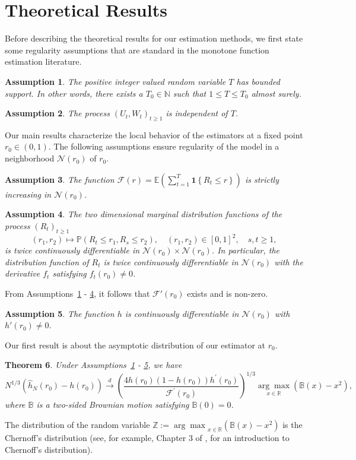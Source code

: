 \documentclass[12pt]{amsart}
\theoremstyle{plain}
\newtheorem{theorem}{Theorem}[section]
\newtheorem{assumption}[theorem]{Assumption}
\theoremstyle{remark}
\numberwithin{equation}{section}
\begin{document}
\section{Theoretical Results}\label{sec3}
Before describing the theoretical results for our estimation methods, we first state some regularity assumptions that are standard in the monotone function estimation literature. 
\begin{assumption}\label{a1}
   The positive integer valued random variable $T$ has bounded support. In other words, there exists a $T_0 \in \mathbb{N}$ such that $1 \leq T \leq T_0$ almost surely.
\end{assumption}
\begin{assumption}\label{a12}
   The process $(U_t, W_t)_{t\geq 1}$ is independent of $T$.
\end{assumption}

Our main results characterize the local behavior of the estimators at a fixed point $r_0 \in (0,1)$. The following assumptions ensure regularity of the model in a neighborhood $\mathcal{N}(r_0)$ of $r_0$.

\begin{assumption}\label{a2}
The function $\mathcal{F}(r) = \mathbb{E}\left( \sum_{t=1}^T \mathbf{1}\left\{R_{t} \leq r\right\} \right)$ is strictly increasing in $\mathcal{N}(r_0)$.
\end{assumption}
\begin{assumption}\label{a3}
    The two dimensional marginal distribution functions of the process $(R_t)_{t\geq1}$ \[(r_1,r_2) \mapsto \mathbb{P}\left(R_t \leq r_1, R_s \leq r_2\right), \quad (r_1,r_2) \in [0,1]^2, \quad s,t \geq 1,\]  is twice continuously differentiable in $\mathcal{N}(r_0) \times \mathcal{N}(r_0)$. In particular, the distribution function of $R_t$ is twice continuously differentiable in $\mathcal{N}(r_0)$ with the derivative $f_t$ satisfying $f_t(r_0) \neq 0$. %
\end{assumption}
From Assumptions~\ref{a1} - \ref{a3}, it follows that $\mathcal{F}'(r_0)$ exists and is non-zero.
\begin{assumption}\label{a4}
    The function $h$ is continuously differentiable in $\mathcal{N}(r_0)$ with $h'(r_0) \neq 0$.
\end{assumption}
Our first result is about the asymptotic distribution of our estimator at $r_0$.
\begin{theorem}\label{thm1}
Under Assumptions~\ref{a1} - \ref{a4}, we have
    \[N^{1 / 3}\left(\hat{h}_{N}\left(r_{0}\right)-h\left(r_{0}\right)\right) \stackrel{d}{\rightarrow} \left(\frac{4h\left(r_{0}\right)\left(1-h\left(r_{0}\right)\right) h^{\prime}\left(r_{0}\right)}{\mathcal{F}^{\prime}\left(r_{0}\right)}\right)^{1 / 3} \underset{x \in \mathbb{R}}{\arg \max }\left(\mathbb{B}(x)-x^{2}\right),\]
    where $\mathbb{B}$ is a two-sided Brownian motion satisfying $\mathbb{B}(0) = 0$.
\end{theorem}
The distribution of the random variable \(\mathbb{Z} := {\arg \max }_{x \in \mathbb{R}}\left(\mathbb{B}(x)-x^{2}\right)\) is the Chernoff's distribution (see, for example, Chapter 3 of \cite{MR3445293}, for an introduction to Chernoff's distribution). 
\end{document}
